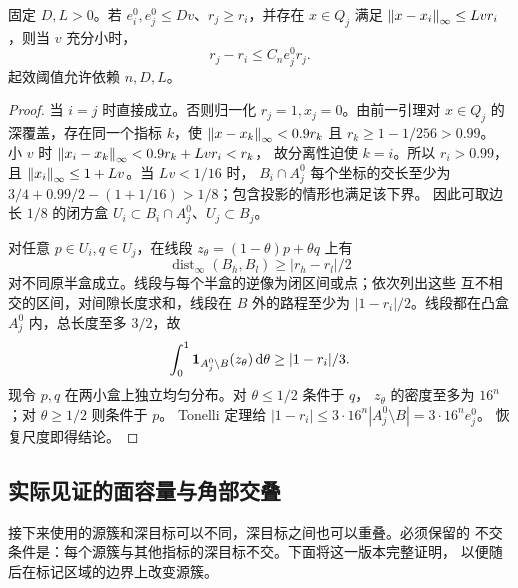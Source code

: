 \begin{lemma}[相邻大尺度的线性控制]\label{lem:global-linear-radius}
固定 \(D,L>0\)。若 \(e_i^0,e_j^0\le Dv\)、\(r_j\ge r_i\)，并存在
\(x\in Q_j\) 满足 \(\left\lVert x-x_i\right\rVert_\infty\le Lvr_i\)，则当 \(v\) 充分小时，
\begin{equation}\label{eq:global-linear-radius}
 r_j-r_i\le C_n e_j^0r_j.
\end{equation}
起效阈值允许依赖 \(n,D,L\)。
\end{lemma}
\begin{proof}
当 \(i=j\) 时直接成立。否则归一化 \(r_j=1,x_j=0\)。由前一引理对
\(x\in Q_j\) 的深覆盖，存在同一个指标 \(k\)，使
\(\left\lVert x-x_k\right\rVert_\infty<0.9r_k\) 且 \(r_k\ge1-1/256>0.99\)。
小 \(v\) 时
\(\left\lVert x_i-x_k\right\rVert_\infty<0.9r_k+Lv r_i<r_k\)，
故分离性迫使 \(k=i\)。所以 \(r_i>0.99\)，且
\(\left\lVert x_i\right\rVert_\infty\le1+Lv\)。当 \(Lv<1/16\) 时，
\(B_i\cap A_j^0\) 每个坐标的交长至少为
\(3/4+0.99/2-(1+1/16)>1/8\)；包含投影的情形也满足该下界。
因此可取边长 \(1/8\) 的闭方盒
\(U_i\subset B_i\cap A_j^0\)、\(U_j\subset B_j\)。

对任意 \(p\in U_i,q\in U_j\)，在线段
\(z_\theta=(1-\theta)p+\theta q\) 上有
\[
 \operatorname{dist}_\infty(B_h,B_l)\ge|r_h-r_l|/2
\]
对不同原半盒成立。线段与每个半盒的逆像为闭区间或点；依次列出这些
互不相交的区间，对间隙长度求和，线段在 \(B\) 外的路程至少为
\(|1-r_i|/2\)。线段都在凸盒 \(A_j^0\) 内，总长度至多 \(3/2\)，故
\[
 \int_0^1\mathbf 1_{A_j^0\setminus B}(z_\theta)\,\mathrm d\theta
 \ge|1-r_i|/3.
\]
现令 \(p,q\) 在两小盒上独立均匀分布。对 \(\theta\le1/2\) 条件于 \(q\)，
\(z_\theta\) 的密度至多为 \(16^n\)；对 \(\theta\ge1/2\) 则条件于 \(p\)。
Tonelli 定理给
\(|1-r_i|\le3\cdot16^n|A_j^0\setminus B|=3\cdot16^ne_j^0\)。
恢复尺度即得结论。
\end{proof}

\subsection{实际见证的面容量与角部交叠}

接下来使用的源簇和深目标可以不同，深目标之间也可以重叠。必须保留的
不交条件是：每个源簇与其他指标的深目标不交。下面将这一版本完整证明，
以便随后在标记区域的边界上改变源簇。

